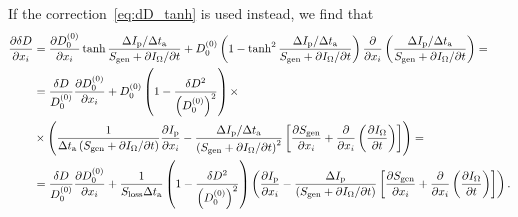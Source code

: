 \documentclass{notes}
\begin{document}
	If the correction~\eqref{eq:dD_tanh} is used instead, we find that
	\begin{equation}
		\begin{aligned}
			\frac{\partial\delta D}{\partial x_i} &=
				\frac{\partial D_0^{(0)}}{\partial x_i}\tanh\frac{\Delta I_{\rm p}/\Delta t_{\rm a}}{S_{\rm gen}+\partial I_\Omega/\partial t} +
				D_0^{(0)}\left(1-\tanh^2\frac{\Delta I_{\rm p}/\Delta t_{\rm a}}{S_{\rm gen}+\partial I_\Omega/\partial t}\right)
				\frac{\partial}{\partial x_i}\left(
					\frac{\Delta I_{\rm p}/\Delta t_{\rm a}}{S_{\rm gen}+\partial I_\Omega/\partial t}
				\right) =\\
			&= \frac{\delta D}{D_0^{(0)}}\frac{\partial D_0^{(0)}}{\partial x_i} +
			D_0^{(0)}\left(1-\frac{\delta D^2}{\left(D_0^{(0)}\right)^2}\right)\times\\
			&\times
			\left(
				\frac{1}{\Delta t_{\rm a}\left(S_{\rm gen}+\partial I_\Omega/\partial t\right)}\frac{\partial I_{\rm p}}{\partial x_i} -
				\frac{\Delta I_{\rm p}/\Delta t_{\rm a}}
					{\left(S_{\rm gen}+\partial I_\Omega/\partial t\right)^2}
					\left[
						\frac{\partial S_{\rm gen}}{\partial x_i} +
						\frac{\partial}{\partial x_i}\left(
							\frac{\partial I_\Omega}{\partial t}
						\right)
					\right]
			\right) =\\
			&= \frac{\delta D}{D_0^{(0)}}\frac{\partial D_0^{(0)}}{\partial x_i} +
			\frac{1}{S_{\rm loss}\Delta t_{\rm a}}\left(
				1-\frac{\delta D^2}{\left(D_0^{(0)}\right)^2}
			\right)\left(
				\frac{\partial I_{\rm p}}{\partial x_i} - 
				\frac{\Delta I_{\rm p}}{\left(S_{\rm gen}+\partial I_\Omega/\partial t\right)}
				\left[
					\frac{\partial S_{\rm gen}}{\partial x_i} +
					\frac{\partial}{\partial x_i}\left(
						\frac{\partial I_\Omega}{\partial t}
					\right)
				\right]
			\right).
		\end{aligned}
	\end{equation}

	\appendix
\end{document}
